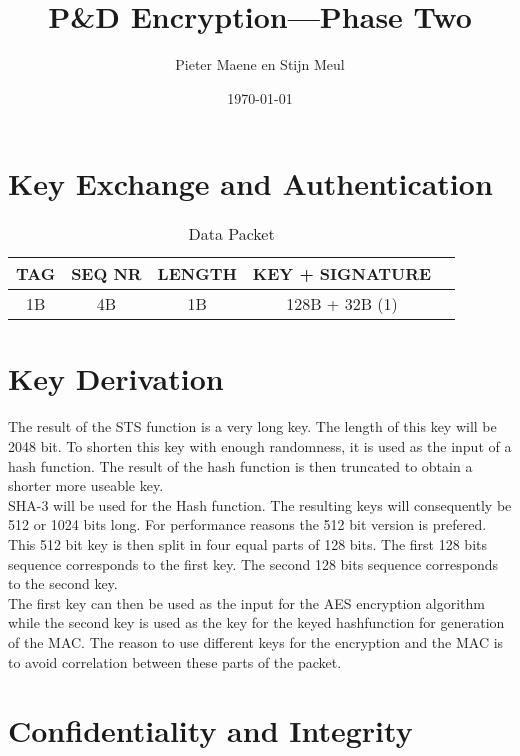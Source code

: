 \documentclass[a4paper]{article}
\title{P\&D Encryption---Phase Two}
\author{Pieter Maene en Stijn Meul}
\date{\today}
\begin{document}
\maketitle

\section{Key Exchange and Authentication}

\begin{table}[h]
    \begin{center}
        \begin{tabular}{| c | c | c | c | c |}
            \hline
            TAG & SEQ NR & LENGTH & KEY + SIGNATURE \\ \hline
            1B & 4B & 1B & 128B + 32B (1) \\
            \hline
        \end{tabular}
    \end{center}
    
    \caption{Data Packet}
\end{table}

\section{Key Derivation}

The result of the STS function is a very long key. The length of this key will be 2048 bit. To shorten this key with enough randomness, it is used as the input of a hash function. The result of the hash function is then truncated to obtain a shorter more useable key.\\

SHA-3 will be used for the Hash function. The resulting keys will consequently be 512 or 1024 bits long. For performance reasons the 512 bit version is prefered. This 512 bit key is then split in four equal parts of 128 bits. The first 128 bits sequence corresponds to the first key. The second 128 bits sequence corresponds to the second key.\\

The first key can then be used as the input for the AES encryption algorithm while the second key is used as the key for the keyed hashfunction for generation of the MAC. The reason to use different keys for the encryption and the MAC is to avoid correlation between these parts of the packet.

\section{Confidentiality and Integrity}
\end{document}
